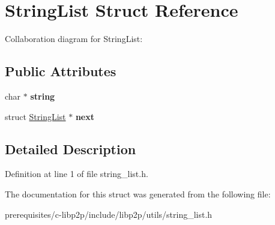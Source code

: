 \hypertarget{struct_string_list}{}\section{String\+List Struct Reference}
\label{struct_string_list}


Collaboration diagram for String\+List\+:
\subsection*{Public Attributes}
\begin{DoxyCompactItemize}
\item 
\mbox{\label{struct_string_list_a999e3cb65307f73ccebf8cee41725aa0}} 
char $\ast$ {\bfseries string}
\item 
\mbox{\label{struct_string_list_a693dda485ada49c11869642c95531c58}} 
struct \mbox{\hyperlink{struct_string_list}{String\+List}} $\ast$ {\bfseries next}
\end{DoxyCompactItemize}


\subsection{Detailed Description}


Definition at line 1 of file string\+\_\+list.\+h.



The documentation for this struct was generated from the following file\+:\begin{DoxyCompactItemize}
\item 
prerequisites/c-\/libp2p/include/libp2p/utils/string\+\_\+list.\+h\end{DoxyCompactItemize}
